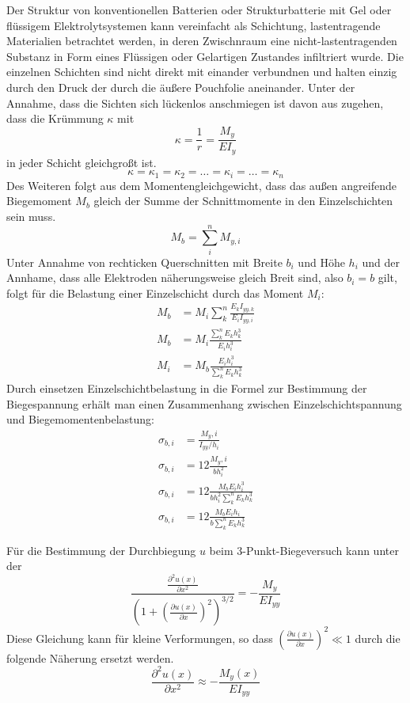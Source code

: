 Der Struktur von konventionellen Batterien oder Strukturbatterie mit Gel oder flüssigem Elektrolytsystemen kann vereinfacht als Schichtung, lastentragende Materialien betrachtet werden, in deren Zwischnraum eine nicht-lastentragenden Substanz in Form eines Flüssigen oder Gelartigen Zustandes infiltriert wurde.
Die einzelnen Schichten sind nicht direkt mit einander verbundnen und halten einzig durch den Druck der durch die äußere Pouchfolie aneinander. Unter der Annahme, dass die Sichten sich lückenlos anschmiegen ist davon aus zugehen, dass die Krümmung $\kappa$ mit
\begin{equation}
    \kappa = \frac{1}{r} = \frac{M_y}{E I_y}
\end{equation}
in jeder Schicht gleichgroßt ist.
\begin{equation}
    \kappa = \kappa_1 = \kappa_2 = \dots = \kappa_i = \dots = \kappa_n
\end{equation}
Des Weiteren folgt aus dem Momentengleichgewicht, dass das außen angreifende Biegemoment $M_{b}$ gleich der Summe der Schnittmomente in den Einzelschichten sein muss.
\begin{equation}
    M_{b} = \sum_{i}^{n}M_{y,i}
\end{equation}
Unter Annahme von rechticken Querschnitten mit Breite $b_i$ und Höhe $h_i$ und der Annhame, dass alle Elektroden näherungsweise gleich Breit sind, also $b_i = b$ gilt, folgt für die Belastung einer Einzelschicht durch das Moment $M_i$:
\begin{align}
    M_{b} &= M_i \sum_{k}^{n}\frac{E_k I_{yy,k}}{E_i I_{yy,i}}\\
    M_{b} &= M_i \frac{\sum_{k}^{n} E_k h_k^3}{E_i h_i^3}\\
    M_i &= M_{b} \frac{ E_i h_i^3} { \sum_{k}^{n}E_k h_k^3}
\end{align}
Durch einsetzen Einzelschichtbelastung in die Formel zur Bestimmung der Biegespannung erhält man einen Zusammenhang zwischen Einzelschichtspannung und Biegemomentenbelastung:
\begin{align}
    \sigma_{b,i} &= \frac{M_y,i}{I_{yy}/h_i} \\
    \sigma_{b,i} &= 12 \frac{ M_y,i}{b h_i^2}\\
    \sigma_{b,i} &= 12 \frac{M_{b} E_i h_i^3}{b h_i^2 \sum_{k}^{n}E_k h_k^3}\\
    \sigma_{b,i} &= 12 \frac{M_{b} E_i h_i}{b \sum_{k}^{n}E_k h_k^3}
\end{align}

Für die Bestimmung der Durchbiegung $u$ beim 3-Punkt-Biegeversuch kann 
unter der
\begin{equation}
\frac{\frac{\partial^2 u(x)}{\partial x^2}}{\left(1 + \left(\frac{\partial u(x)}{\partial x} \right)^2 \right)^{3/2}} = -\frac{M_y}{E I_{yy}}
\end{equation}
Diese Gleichung kann für kleine Verformungen, so dass $(\frac{\partial u(x)}{\partial x})^2 \ll 1$ durch die folgende Näherung ersetzt werden.
\begin{equation}
    \frac{\partial^2 u(x)}{\partial x^2} \approx -\frac{M_y(x)}{E I_{yy}}
\end{equation}

